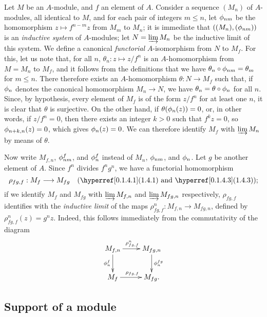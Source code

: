 \begin{env}[1.6.1]
\label{0.1.6.1}
Let $M$ be an $A$-module, and $f$ an element of $A$. Consider a sequence $(M_n)$ of
$A$-modules, all identical to $M$, and for each pair of integers $m\leqslant n$,
let $\phi_{nm}$ be the homomorphism $z\mapsto f^{n-m}z$ from $M_m$ to $M_n$; it
is immediate that $((M_n),(\phi_{nm}))$ is an \emph{inductive system} of
$A$-modules; let $N=\varinjlim M_n$ be the inductive limit of this system. We
define a canonical \emph{functorial} $A$-isomorphism from $N$ to $M_f$. For this, let us note that, for all $n$, $\theta_n:z\mapsto z/f^n$ is an
$A$-homomorphism from $M=M_n$ to $M_f$, and it follows from the definitions that
we have $\theta_n\circ\phi_{nm}=\theta_m$ for $m\leqslant n$. There therefore
exists an $A$-homomorphism $\theta:N\to M_f$ such that, if $\phi_n$ denotes the
canonical homomorphism $M_n\to N$, we have $\theta_n=\theta\circ\phi_n$ for all
$n$. Since, by hypothesis, every element of $M_f$ is of the form $z/f^n$ for at
least one $n$, it is clear that $\theta$ is surjective. On the other hand, if
$\theta(\phi_n(z))=0$, or, in other words, if $z/f^n=0$, then there exists an integer
$k>0$ such that $f^k z=0$, so $\phi_{n+k,n}(z)=0$, which gives $\phi_n(z)=0$.
We can therefore identify $M_f$ with $\varinjlim M_n$ by means of $\theta$.
\end{env}

\begin{env}[1.6.2]
\label{0.1.6.2}
Now write $M_{f,n}$, $\phi_{nm}^f$, and $\phi_n^f$ instead of $M_n$,
$\phi_{nm}$, and $\phi_n$. Let $g$ be another element of $A$. Since $f^n$ divides
$f^n g^n$, we have a functorial homomorphism
\[
  \rho_{fg,f}:M_f\to M_{fg}
  \quad(\sref{0.1.4.1}\text{ and }\sref{0.1.4.3});
\]
if
we identify $M_f$ and $M_{fg}$ with $\varinjlim M_{f,n}$ and
$\varinjlim M_{fg,n}$ respectively, $\rho_{fg,f}$ identifies with the
\emph{inductive limit} of the maps $\rho_{fg,f}^n:M_{f,n}\to M_{fg,n}$, defined
by $\rho_{fg,f}^n(z)=g^n z$. Indeed, this follows immediately from the
commutativity of the diagram
\[
  \xymatrix{
    M_{f,n}\ar[r]^{\rho_{fg,f}^n}\ar[d]_{\vphi_n^f} &
    M_{fg,n}\ar[d]^{\vphi_n^{fg}}\\
    M_f\ar[r]^{\rho_{fg,f}} &
    M_{fg}.
  }
\]
\end{env}

\subsection{Support of a module}
\label{subsection-support-of-module}

